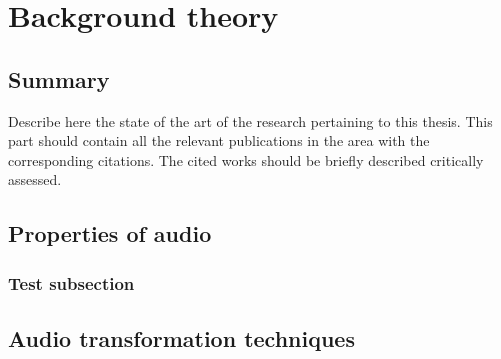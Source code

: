 
\chapter{Background theory}
\label{chap:relatedterms}
\ifpdf
    \graphicspath{{RelatedTerminology/Figures/PNG/}{RelatedTerminology/Figures/PDF/}{RelatedTerminology/Figures/}}
\else
    \graphicspath{{RelatedTerminology/Figures/EPS/}{RelatedTerminology/Figures/}}
\fi


\section*{Summary}

Describe here the state of the art of the research pertaining to this thesis. This part should contain all the relevant publications in the area with the corresponding citations. The cited works should be briefly described critically assessed.
%


\section{Properties of audio}
\label{sec:audioprops}
\subsection{Test subsection}
\label{sec:subsec21}

\section{Audio transformation techniques}
\label{sec:audiotransform}
